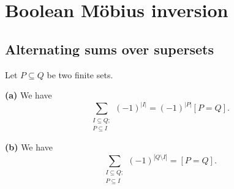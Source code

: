 \section{Boolean M\"{o}bius inversion}

\subsection{Alternating sums over supersets}

\begin{lemma}
\label{lem.pie.two-sets-altsum}
\leanok
Let $P \subseteq Q$ be two finite sets.

\textbf{(a)} We have
\begin{equation}
\sum_{\substack{I\subseteq Q;\\P\subseteq I}}\left(  -1\right)  ^{\left\vert
I\right\vert }=\left(  -1\right)  ^{\left\vert P\right\vert }\left[
P=Q\right]  . \label{eq.lem.pie.two-sets-altsum.a}
\end{equation}


\textbf{(b)} We have
\begin{equation}
\sum_{\substack{I\subseteq Q;\\P\subseteq I}}\left(  -1\right)  ^{\left\vert
Q\setminus I\right\vert }=\left[  P=Q\right]  .
\label{eq.lem.pie.two-sets-altsum.b}
\end{equation}
\end{lemma}

